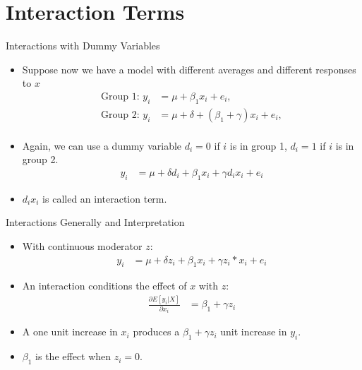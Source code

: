 \documentclass[aspectratio=169]{beamer}
\numberwithin{equation}{section}
\begin{document}
\section{Interaction Terms}

\setcounter{subsection}{1}
\begin{frame}{Interactions with Dummy Variables}
\begin{itemize}
\item Suppose now we have a model with different averages and different responses to $x$
\begin{align*}
\text{Group 1: }y_i&=\mu+\beta_1x_i+e_i,\\
\text{Group 2: }y_i&=\mu+\delta+(\beta_1+\gamma)x_i+e_i,\\
\end{align*}
\item Again, we can use a dummy variable $d_i=0$ if $i$ is in group 1, $d_i=1$ if $i$ is in group 2.
\begin{align*}
y_i&=\mu+\delta d_i+ \beta_1x_i+  \gamma d_i x_i+e_i
\end{align*}
\item $d_ix_i$ is called an interaction term.
\end{itemize}
\end{frame}

\begin{frame}{Interactions Generally and Interpretation}
\begin{itemize}
\item With continuous moderator $z$:
\begin{align*}
y_i&=\mu+ \delta z_i +\beta_1 x_i+  \gamma z_i*x_i+e_i
\end{align*} \pause
\item An interaction conditions the effect of $x$ with $z$:
\begin{align*}
\frac{\partial E[y_i|X]}{\partial x_i}&=\beta_1 +  \gamma z_i
\end{align*}
\item A one unit increase in $x_i$ produces a $\beta_1 +  \gamma z_i$ unit increase in $y_i$.
\item $\beta_1$ is the effect when $z_i=0$.
\end{itemize}
\end{frame}
\end{document}
